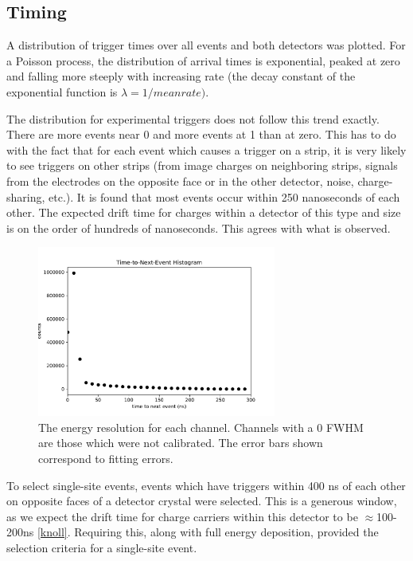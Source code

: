 \subsection*{Timing}

A distribution of trigger times over all events and both detectors was plotted. For a Poisson process, the distribution of arrival times is exponential, peaked at zero and falling more steeply with increasing rate (the decay constant of the exponential function is $\lambda = 1/mean rate)$. 

The distribution for experimental triggers does not follow this trend exactly. There are more events near 0 and more events at 1 than at zero. This has to do with the fact that for each event which causes a trigger on a strip, it is very likely to see triggers on other strips (from image charges on neighboring strips, signals from the electrodes on the opposite face or in the other detector, noise, charge-sharing, etc.). It is found that most events occur within 250 nanoseconds of each other. The expected drift time for charges within a detector of this type and size is on the order of hundreds of nanoseconds. This agrees with what is observed. 

\begin{figure}
\begin{centering}
\includegraphics[width=0.7\textwidth]{./figures/time-to-next-event.pdf}
\caption{The energy resolution for each channel. Channels with a 0 FWHM are those which were not calibrated. The error bars shown correspond to fitting errors.}
\label{timehist}
\end{centering}
\end{figure}

To select single-site events, events which have triggers within 400 ns of each other on opposite faces of a detector crystal were selected. This is a generous window, as we expect the drift time for charge carriers within this detector to be $\approx$100-200ns \ref{knoll}. Requiring this, along with full energy deposition, provided the selection criteria for a single-site event.

